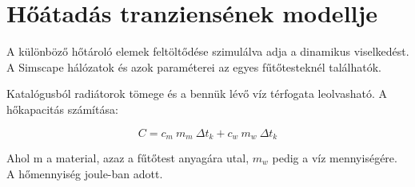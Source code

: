 \section{Hőátadás tranziensének modellje}\label{section:dinamikus}


A különböző hőtároló elemek feltöltődése szimulálva adja a dinamikus viselkedést. A Simscape hálózatok és azok paraméterei az egyes fűtőtesteknél találhatók.

Katalógusból radiátorok tömege és a bennük lévő víz térfogata leolvasható. A hőkapacitás számítása:

\begin{equation} \label{eq_hotartalom}
C = c_{m} ~ m_m ~ \Delta t_k + c_{w} ~ m_w ~ \Delta t_k
\end{equation}

Ahol m a material, azaz a fűtőtest anyagára utal, $m_w$ pedig a víz mennyiségére. A hőmennyiség joule-ban adott.







